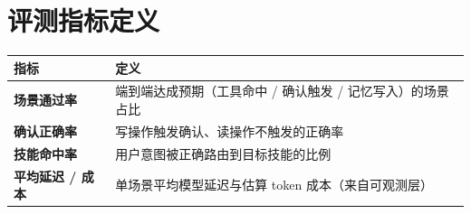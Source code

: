 \section{评测指标定义}
\begin{center}
\small
\begin{tabularx}{\linewidth}{>{\bfseries}p{3.4cm} X}
\toprule
指标 & 定义 \\
\midrule
场景通过率 & 端到端达成预期（工具命中 / 确认触发 / 记忆写入）的场景占比 \\
确认正确率 & 写操作触发确认、读操作不触发的正确率 \\
技能命中率 & 用户意图被正确路由到目标技能的比例 \\
平均延迟 / 成本 & 单场景平均模型延迟与估算 token 成本（来自可观测层） \\
\bottomrule
\end{tabularx}
\end{center}
